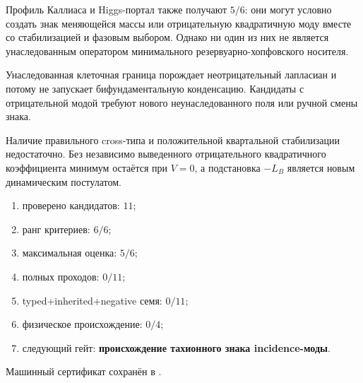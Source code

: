 Профиль Каллиаса и Higgs-портал также получают $5/6$: они могут условно
создать знак меняющейся массы или отрицательную квадратичную моду вместе со
стабилизацией и фазовым выбором. Однако ни один из них не является
унаследованным оператором минимального резервуарно-хопфовского носителя.

\begin{theorem}
Унаследованная клеточная граница порождает неотрицательный лапласиан и
потому не запускает бифундаментальную конденсацию. Кандидаты с отрицательной
модой требуют нового неунаследованного поля или ручной смены знака.
\end{theorem}

\begin{nogocriterion}
Наличие правильного cross-типа и положительной квартальной стабилизации
недостаточно. Без независимо выведенного отрицательного квадратичного
коэффициента минимум остаётся при $V=0$, а подстановка $-L_B$ является
новым динамическим постулатом.
\end{nogocriterion}

\begin{protocol}\begin{enumerate}
\item проверено кандидатов: \textbf{$11$};
\item ранг критериев: \textbf{$6/6$};
\item максимальная оценка: \textbf{$5/6$};
\item полных проходов: \textbf{$0/11$};
\item typed+inherited+negative семя: \textbf{$0/11$};
\item физическое происхождение: \textbf{$0/4$};
\item следующий гейт: \textbf{происхождение тахионного знака incidence-моды}.
\end{enumerate}\end{protocol}

Машинный сертификат сохранён в
.